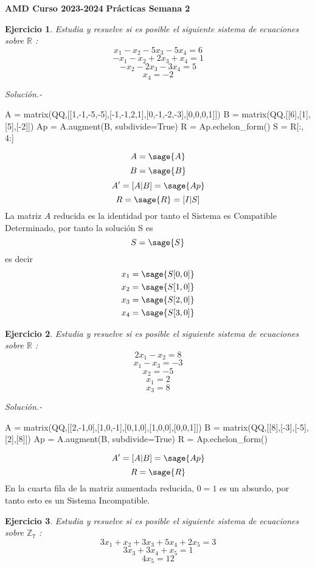 \documentclass{amsart}
\newtheorem{ejer}{Ejercicio}
\def\r{\mathbb{R}}
\def\z{\mathbb{Z}}
\begin{document}
\begin{center}
\textrm{ \bf {AMD Curso 2023-2024}}
\vskip 0.3cm
\textrm{ \bf {Prácticas Semana 2} }
\end{center}

\begin{ejer} Estudia y resuelve si es posible el siguiente sistema de ecuaciones sobre $\r $ :
\[ x_{1} - x_{2} - 5 x_{3} - 5 x_{4} = 6 \]
\[ -x_{1} - x_{2} + 2 x_{3} + x_{4} = 1 \]
\[ -x_{2} - 2 x_{3} - 3 x_{4} = 5 \]
\[ x_{4} = -2 \]
\end{ejer}

{\it Soluci\'on.-}
\begin{sageblock}
A = matrix(QQ,[[1,-1,-5,-5],[-1,-1,2,1],[0,-1,-2,-3],[0,0,0,1]])
B = matrix(QQ,[[6],[1],[5],[-2]])
Ap = A.augment(B, subdivide=True)
R = Ap.echelon_form()
S = R[:, 4:]
\end{sageblock}

$$
	A = \sage{A}
$$
$$
	B = \sage{B}
$$
$$
	A' = [A|B] = \sage{Ap}
$$
$$
	R = \sage{R} = [I|S]
$$
La matriz $A$ reducida es la identidad por tanto el Sistema es Compatible Determinado, por tanto la solución S es
$$
	S = \sage{S}
$$
es decir
\begin{align*}
	x_1 &= \sage{S[0, 0]} \\
	x_2 &= \sage{S[1, 0]} \\
	x_3 &= \sage{S[2, 0]} \\ 
	x_4 &= \sage{S[3, 0]}
\end{align*}


\begin{ejer} Estudia y resuelve si es posible el siguiente sistema de ecuaciones sobre $\r $ :
\[ 2 x_{1} - x_{2} = 8 \]
\[ x_{1} - x_{3} = -3 \]
\[ x_{2} = -5 \]
\[ x_{1} = 2 \]
\[ x_{3} = 8 \]
\end{ejer}

{\it Soluci\'on.-}
\begin{sageblock}
A = matrix(QQ,[[2,-1,0],[1,0,-1],[0,1,0],[1,0,0],[0,0,1]])
B = matrix(QQ,[[8],[-3],[-5],[2],[8]])
Ap = A.augment(B, subdivide=True)
R = Ap.echelon_form()
\end{sageblock}

$$
	A' = [A|B] = \sage{Ap}
$$
$$
	R = \sage{R}
$$
En la cuarta fila de la matriz aumentada reducida, $0=1$ es un absurdo, por tanto esto es un Sistema Incompatible.



\begin{ejer} Estudia y resuelve si es posible el siguiente sistema de ecuaciones sobre $\z _7$ :
\[ 3x_{1} + x_{2} + 3x_{3} + 5x_{4} + 2x_{5} = 3 \]
\[ 3x_{3} + 3x_{4} + x_{5} = 1 \]
\[ 4x_{5} = 12 \]

\end{ejer}
\end{document}
